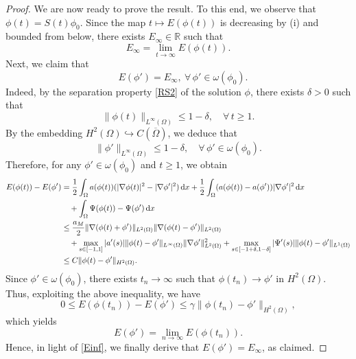 \documentclass[11pt,reqno]{amsart}
\theoremstyle{remark}
\def\R{\mathbb{R}}
\def\d{{\rm d}}
\numberwithin{equation}{section}
\def\d{{\rm d}}
\newcommand{\vp}{\phi}
\begin{document}
\begin{proof}
We are now ready to prove the result. To this end, we observe that $\phi(t)=S(t)\phi_0$. Since the map $t\mapsto E(\phi(t))$ is decreasing by (i) and bounded from below, there exists $E_\infty\in\R$ such that
\begin{equation}
\label{Einf}
E_\infty=\lim_{t\to \infty} E(\phi(t)).
\end{equation}
Next, we claim that
\begin{equation}
\label{Einf-2}
\quad E(\phi')=E_\infty, \ \forall \, \phi' \in \omega(\phi_0).
\end{equation}
Indeed, by the separation property \eqref{RS2} of the solution $\phi$, there exists $\delta>0$ such that 
$$
\|\phi(t)\|_{L^\infty(\Omega)}\leq 1-\delta, \quad \forall \, t\geq 1.
$$
By the embedding $H^2(\Omega)\hookrightarrow C(\overline{\Omega})$, we deduce that
$$
\|\phi'\|_{L^\infty(\Omega)}\leq 1-\delta,\quad \forall \, \phi'\in \omega(\phi_0).
$$
Therefore, for any $\phi'\in \omega(\phi_0)$ and $t\geq 1$, we obtain
\begin{align*}
E(\vp(t))-E(\vp')
&=\frac12\int_\Omega a(\vp(t))(|\nabla \vp(t)|^2-|\nabla\vp'|^2)\,\d x
+\frac12\int_\Omega (a(\vp(t))-a(\vp'))|\nabla\vp'|^2\,\d x
\notag
\\ 
&\quad
+\int_\Omega \Psi(\vp(t))-\Psi(\vp')\, \d x 
\notag
\\
 &\leq \frac{a_M}{2}
 \|\nabla (\vp(t)+\vp')\|_{L^2(\Omega)}
\|\nabla (\vp(t)-\vp')\|_{L^2(\Omega)}
\notag
\\
&\quad
+\max_{s\in [-1,1]}|a'(s)| \|\vp(t)-\vp'\|_{L^\infty(\Omega)}\|\nabla\vp'\|_{L^2(\Omega)}^2
+ \max_{s\in[-1+\delta,1-\delta]}|\Psi'(s)|
  \|\vp(t)-\vp'\|_{L^1(\Omega)}\nonumber\\
& \leq C \|\vp(t)-\vp'\|_{H^2(\Omega)}.
\end{align*}
Since $\phi'\in \omega(\phi_0)$, there exists $t_n\to\infty$ such that $\phi(t_n)\to \phi'$ in $H^2(\Omega)$. Thus, exploiting the above inequality, we have
$$
0\leq E(\vp(t_n))-E(\phi')\leq \gamma \|\vp(t_n)-\phi'\|_{H^2(\Omega)},
$$
which yields
$$
E(\phi')=\lim_{n\to\infty} E(\vp(t_n)).
$$
Hence, in light of \eqref{Einf}, we finally derive that $E(\phi')=E_\infty$, as claimed.
\smallskip


\end{proof}
\end{document}
